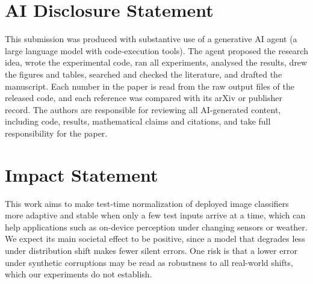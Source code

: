 \documentclass{article}
\begin{document}
\section*{AI Disclosure Statement}
This submission was produced with substantive use of a generative AI agent (a large language model with code-execution tools).
The agent proposed the research idea, wrote the experimental code, ran all experiments, analysed the results, drew the figures and tables, searched and checked the literature, and drafted the manuscript.
Each number in the paper is read from the raw output files of the released code, and each reference was compared with its arXiv or publisher record.
The authors are responsible for reviewing all AI-generated content, including code, results, mathematical claims and citations, and take full responsibility for the paper.

\section*{Impact Statement}
This work aims to make test-time normalization of deployed image classifiers more adaptive and stable when only a few test inputs arrive at a time, which can help applications such as on-device perception under changing sensors or weather.
We expect its main societal effect to be positive, since a model that degrades less under distribution shift makes fewer silent errors.
One risk is that a lower error under synthetic corruptions may be read as robustness to all real-world shifts, which our experiments do not establish.





\end{document}
